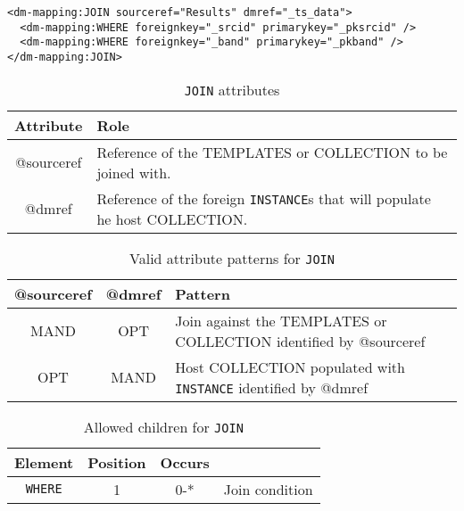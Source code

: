 \begin{lstlisting}[frame=single,label={lst:join},caption={\texttt{JOIN example whit 2 join conditions} },style=XML,basicstyle=\tiny]
<dm-mapping:JOIN sourceref="Results" dmref="_ts_data">
  <dm-mapping:WHERE foreignkey="_srcid" primarykey="_pksrcid" />
  <dm-mapping:WHERE foreignkey="_band" primarykey="_pkband" />
</dm-mapping:JOIN>
\end{lstlisting}


\begin{table}[!htbp]
\small
\centering
\begin{tabulary}{\linewidth}{|c|J|}       
       \hline 
            \textbf{Attribute} & 
            \textbf {Role}\\
       \hline         \hline  
             @sourceref & 
            Reference of the TEMPLATES or COLLECTION to be joined with. \\
        \hline 
            @dmref & 
            Reference of the foreign \texttt{INSTANCE}s that will populate he host COLLECTION. \\
        \hline 
     \end{tabulary}
     \caption{\texttt{JOIN} attributes} 
     \label{tbl:join-att}
 \end{table}

\begin{table}[!htbp]
\small
\centering
\begin{tabulary}{\linewidth}{|c|c|J|}
    \hline 
        \textbf{@sourceref } &
        \textbf{@dmref} &
        \textbf{Pattern}\\
    \hline      \hline  
        MAND &           
        OPT &           
        Join against the TEMPLATES or COLLECTION identified by @sourceref  \\  
    \hline   
        OPT &           
        MAND &      
        Host COLLECTION populated with \texttt{INSTANCE}  identified by @dmref \\
   \hline 
\end{tabulary}
     \caption{Valid attribute patterns for  \texttt{JOIN}}
     \label{tbl:join-pattern}
\end{table}


\begin{table}[!htbp]
\small
\centering
\begin{tabulary}{\linewidth}{|c |c |c|J|}
    \hline 
        \textbf{Element} &
        \textbf{Position} &
        \textbf{Occurs} &
        \\
    \hline      \hline  
        \texttt{WHERE}  &        
        1 &           
        0-* &
         Join condition\\
    \hline 
\end{tabulary}
     \caption{Allowed children for \texttt{JOIN}} 
     \label{tbl:join-chidlren}
 \end{table}
